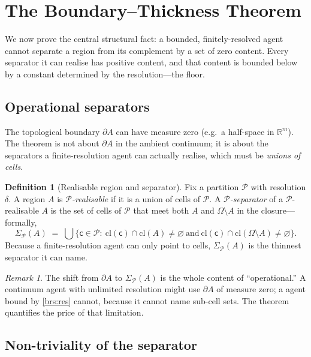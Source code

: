 \documentclass[11pt,a4paper]{article}
\theoremstyle{thmstyle}
\theoremstyle{definition}
\newtheorem{definition}[theorem]{Definition}
\theoremstyle{remark}
\newtheorem{remark}[theorem]{Remark}
\newcommand{\R}{\mathbb{R}}
\newcommand{\Space}{\Omega}
\newcommand{\Bdy}{\partial}
\newcommand{\cl}{\mathrm{cl}}
\newcommand{\reso}{\delta}
\newcommand{\Part}{\mathscr{P}}
\newcommand{\cell}{\mathsf{c}}
\begin{document}
\section{The Boundary--Thickness Theorem}
\label{sec:thickness}

We now prove the central structural fact: a bounded, finitely-resolved agent
cannot separate a region from its complement by a set of zero content. Every
separator it can realise has positive content, and that content is bounded
below by a constant determined by the resolution---the floor.

\subsection{Operational separators}

The topological boundary $\Bdy A$ can have measure zero (e.g.\ a half-space in
$\R^m$). The theorem is not about $\Bdy A$ in the ambient continuum; it is about
the separators a finite-resolution agent can actually realise, which must be
\emph{unions of cells}.

\begin{definition}[Realisable region and separator]
\label{def:realisable}
Fix a partition $\Part$ with resolution $\reso$. A region $A$ is
\emph{$\Part$-realisable} if it is a union of cells of $\Part$. A
\emph{$\Part$-separator} of a $\Part$-realisable $A$ is the set of cells of
$\Part$ that meet both $A$ and $\Space\setminus A$ in the closure---formally,
\[
\Sigma_\Part(A)\;=\;\bigcup\bigl\{\cell\in\Part:\ \cl(\cell)\cap\cl(A)\neq\varnothing
\ \text{and}\ \cl(\cell)\cap\cl(\Space\setminus A)\neq\varnothing\bigr\}.
\]
Because a finite-resolution agent can only point to cells, $\Sigma_\Part(A)$ is
the thinnest separator it can name.
\end{definition}

\begin{remark}
The shift from $\Bdy A$ to $\Sigma_\Part(A)$ is the whole content of
``operational.'' A continuum agent with unlimited resolution might use $\Bdy A$
of measure zero; a agent bound by \ref{brs:res} cannot, because it cannot name
sub-cell sets. The theorem quantifies the price of that limitation.
\end{remark}

\subsection{Non-triviality of the separator}
\end{document}
